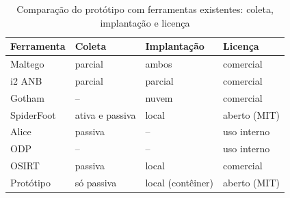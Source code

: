 \begin{table}[htbp]
\centering
\caption[Comparação com ferramentas existentes: coleta e licença]{Comparação do protótipo com ferramentas existentes: coleta, implantação e licença}
\label{tab:mercado-modelo}
\small
\begin{tabular}{lp{3.4cm}p{3.4cm}p{4.2cm}}
\hline
\textbf{Ferramenta} & \textbf{Coleta} & \textbf{Implantação} & \textbf{Licença} \\
\hline
Maltego & parcial & ambos & comercial \\
i2 ANB & parcial & parcial & comercial \\
Gotham & -- & nuvem & comercial \\
SpiderFoot & ativa e passiva & local & aberto (MIT) \\
Alice & passiva & -- & uso interno \\
ODP & -- & -- & uso interno \\
OSIRT & passiva & local & comercial \\
Protótipo & só passiva & local (contêiner) & aberto (MIT) \\
\hline
\end{tabular}
\end{table}
